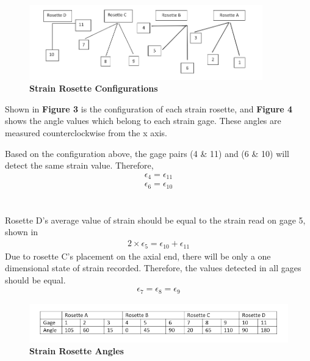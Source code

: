 \documentclass[12pt]{article}
\begin{document}
\begin{figure} [H]
	\centering
	\includegraphics [width=0.9\textwidth]{rosettes}
	\caption{ \textbf{Strain Rosette Configurations}}
\end{figure} 
Shown in \textbf{Figure 3} is the configuration of each strain rosette, and \textbf{Figure 4} shows
the angle values which belong to each strain gage. These angles are measured counterclockwise from the 
x axis. 

Based on the configuration above, the gage pairs (4 \& 11) and (6 \& 10)  will detect the same strain value. Therefore, 
\begin{align}
\epsilon_{4} = \epsilon_{11} \\
\epsilon_{6} = \epsilon_{10} 
\end{align}
\\ \\ Rosette D's average value of strain should be equal to the strain read on gage 5, shown in 
\begin{align}
2\times\epsilon_{5} = \epsilon_{10} + \epsilon_{11}
\end{align}
Due to rosette C's placement on the axial end, there will be only a one dimensional state of strain recorded. Therefore, the values detected in all gages should be equal. 
\begin{align}
\epsilon_{7} = \epsilon{_8} = \epsilon_{9} 
\end{align}

\begin{figure} [H]
	\centering
	\includegraphics [width=1.0\textwidth]{gage_angles}
	\caption{ \textbf{Strain Rosette Angles}}
\end{figure} 

\end{document}
